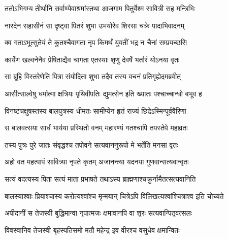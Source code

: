\twolineshloka
{ततोऽभिगम्य तीर्थानि सर्वाण्येवाश्रमांस्तथा}
{आजगाम पितुर्वेश्म सावित्री सह मन्त्रिभिः}


\twolineshloka
{नारदेन सहासीनं सा दृष्ट्वा पितरं शुभा}
{उभयोरेव शिरसा चक्रे पादाभिवादनम्}




\twolineshloka
{क्व गताऽभूत्सुतेयं ते कुतश्चैवागता नृप}
{किमर्थं युवतीं भद्र न चैनां सम्प्रयच्छसि}




\twolineshloka
{कार्येण खल्वनेनैव प्रेषिताद्यैव चागता}
{एतस्याः शृणु देवर्षे भर्तारं योऽनया वृतः}




\twolineshloka
{सा ब्रूहि विस्तरेणेति पित्रा संयोदिता शुभा}
{तदैव तस्य वचनं प्रतिगृह्येदमब्रवीत्}


\twolineshloka
{आसीत्साल्वेषु धर्मात्मा क्षत्रियः पृथिवीपतिः}
{द्युमत्सेन इति ख्यातः पश्चाच्चान्धो बभूव ह}


\twolineshloka
{विनष्टचक्षुषस्तस्य बालपुत्रस्य धीमतः}
{सामीप्येन हृतं राज्यं छिद्रेऽस्मिन्पूर्ववैरिणा}


\twolineshloka
{स बालवत्सया सार्धं भार्यया प्रस्थितो वनम्}
{महारण्यं गतश्चापि तपस्तेपे महाव्रतः}


\twolineshloka
{तस्य पुत्रः पुरे जातः संवृद्धश्च तपोवने}
{सत्यवाननुरूपो मे भर्तेति मनसा वृतः}




\twolineshloka
{अहो वत महत्पापं सावित्र्या नृपते कृतम्}
{अजानन्त्या यदनया गुणवान्सत्यवान्वृतः}


\twolineshloka
{सत्यं वदत्यस्य पिता सत्यं माता प्रभाषते}
{तथाऽस्य ब्राह्मणाश्चक्रुर्नामैतत्सत्यवानिति}


\twolineshloka
{बालस्याश्वाः प्रियाश्चास्य करोत्यश्वांश्च मृन्मयान्}
{चित्रेऽपि विलिखत्यश्वांश्चित्राश्व इति चोच्यते}




\twolineshloka
{अपीदानीं स तेजस्वी बुद्धिमान्वा नृपात्मजः}
{क्षमावानपि वा शृरः सत्यवान्पितृवत्सलः}




\twolineshloka
{विवस्वानिव तेजस्वी बृहस्पतिसमो मतौ}
{महेन्द्र इव वीरश्च वसुधेव क्षमान्वितः}




